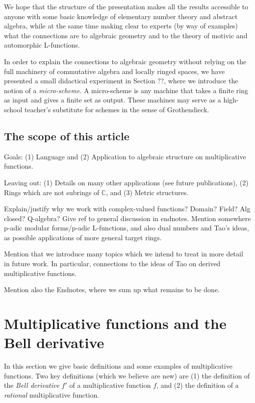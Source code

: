 \documentclass[a4paper]{article}
\theoremstyle{definition}
\theoremstyle{remark}
\newcommand{\C}{\mathbb{C}}
\begin{document}
We hope that the structure of the presentation makes all the results accessible to anyone with some basic knowledge of elementary number theory and abstract algebra, while at the same time making clear to experts (by way of examples) what the connections are to algebraic geometry and to the theory of motivic and automorphic L-functions. 

In order to explain the connections to algebraic geometry without relying on the full machinery of commutative algebra and locally ringed spaces, we have presented a small didactical experiment in Section ??, where we introduce the notion of a \emph{micro-scheme}. A micro-scheme is any machine that takes a finite ring as input and gives a finite set as output. These machines may serve as a high-school teacher's substitute for schemes in the sense of Grothendieck.

\subsection{The scope of this article}

Goals: (1) Language and (2) Application to algebraic structure on multiplicative functions.

Leaving out: (1) Details on many other applications (see future publications), (2) Rings which are not subrings of $\C$, and (3) Metric structures.

Explain/justify why we work with complex-valued functions? Domain? Field? Alg closed? Q-algebra? Give ref to general discussion in endnotes. Mention somewhere p-adic modular forms/p-adic L-functions, and also dual numbers and Tao's ideas, as possible applications of more general target rings.

Mention that we introduce many topics which we intend to treat in more detail in future work. In particular, connections to the ideas of Tao on derived multiplicative functions.

Mention also the Endnotes, where we sum up what remains to be done.



\section{Multiplicative functions and the Bell derivative}

In this section we give basic definitions and some examples of multiplicative functions. Two key definitions (which we believe are new) are (1) the definition of the \emph{Bell derivative} $f'$ of a multiplicative function $f$, and (2) the definition of  a \emph{rational} multiplicative function.
\end{document}
